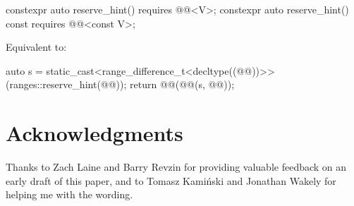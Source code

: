 \documentclass{wg21}
\begin{document}
\begin{addedblock}
\begin{itemdecl}
    constexpr auto reserve_hint() requires @@<V>;
    constexpr auto reserve_hint() const requires @@<const V>;
\end{itemdecl}

\begin{itemdescr}
\pnum
\effects
Equivalent to:
\begin{codeblock}
auto s = static_cast<range_difference_t<decltype((@@))>>(ranges::reserve_hint(@@));
return @@(@@(s, @@));
\end{codeblock}
\end{itemdescr}
\end{addedblock}


\section{Acknowledgments}

Thanks to Zach Laine and Barry Revzin for providing valuable feedback on an early draft of this paper,
and to Tomasz Kamiński and Jonathan Wakely for helping me with the wording.







\renewcommand{\section}[2]{}%

\begin{thebibliography}{9}


\end{thebibliography}
\end{document}
